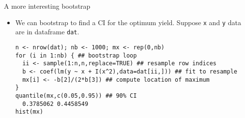 \documentclass{beamer}
\newcommand{\eps}[3]
{{\begin{center}
 \rotatebox{#1}{\scalebox{#2}{\texttt{[image: \#3]}}}
 \end{center}}
}
\begin{document}
\begin{frame}[fragile]{A more interesting bootstrap}
\begin{itemize}
\item We can bootstrap to find a CI for the optimum yield. Suppose {\tt x} and {\tt y} data are in dataframe {\tt dat}. 
{\scriptsize
\begin{verbatim}
n <- nrow(dat); nb <- 1000; mx <- rep(0,nb)
for (i in 1:nb) { ## bootstrap loop
  ii <- sample(1:n,n,replace=TRUE) ## resample row indices
  b <- coef(lm(y ~ x + I(x^2),data=dat[ii,])) ## fit to resample
  mx[i] <- -b[2]/(2*b[3]) ## compute location of maximum
}
quantile(mx,c(0.05,0.95)) ## 90% CI
  0.3785062 0.4458549
hist(mx)
\end{verbatim}
} 
\vspace*{-.5cm}
\eps{-90}{.35}{quad-mod-hist.eps}

\end{itemize}
\end{frame}
\end{document}
